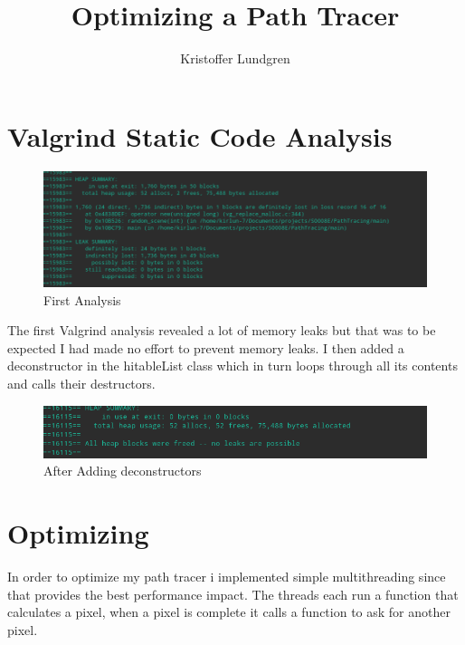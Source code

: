 \documentclass{article}
\title{Optimizing a Path Tracer}
\author{Kristoffer Lundgren}
\begin{document}
\maketitle
{}
\newpage
{}

\section{Valgrind Static Code Analysis}
    \begin{figure}[!htb]
        \includegraphics[width=\linewidth]{first_analysis.png}
        \caption{First Analysis}
        \label{fig:a1}
    \end{figure}
    The first Valgrind analysis revealed a lot of memory leaks but that was to be expected
    I had made no effort to prevent memory leaks. I then added a deconstructor in the hitableList class which in turn loops through all its contents and calls their destructors.
    \begin{figure}[!htb]
        \includegraphics[width=\linewidth]{after_deletes.png}
        \caption{After Adding deconstructors}
        \label{fig:a2}
    \end{figure}
\newpage
\section{Optimizing}
    In order to optimize my path tracer i implemented simple multithreading since that provides the best performance impact. The threads each run a function that calculates a pixel, when a pixel is
    complete it calls a function to ask for another pixel.
\end{document}
